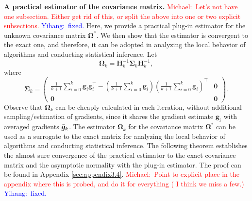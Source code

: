 \documentclass[aos]{imsart}
\numberwithin{equation}{section}
\theoremstyle{plain}
\newcommand{\michael}[1]{\textcolor{red}{Michael:\ #1}}
\newcommand{\yihang}[1]{\textcolor{blue}{Yihang:\ #1}}
\begin{document}
\textbf{A practical estimator of the covariance matrix.}
\michael{Let's not have one subsection.  Either get rid of this, or split the above into one or two explicit subsections.}
\yihang{fixed.}
Here, we provide a practical plug-in estimator for the unknown covariance matrix $\bm{\Omega}^{*}$. 
We then show that the estimator is convergent to the exact one, and therefore, it can be adopted in analyzing the local behavior of algorithms and conducting statistical inference.
Let 
\begin{equation}
    \bm{\Omega}_{k} = \bm{H}_{k}^{-1} \bm{\Sigma}_{k} \bm{H}_{k}^{-1},
\end{equation}
where 
\begin{equation*}
    \bm{\Sigma}_{k} = \left( \begin{array}{cc}
        \frac{1}{k+1}\sum_{i=0}^{k} \bm{g}_i \bm{g}_i^{\top} - \left( \frac{1}{k+1}\sum_{i=0}^{k} \bm{g}_i\right)\left( \frac{1}{k+1}\sum_{i=0}^{k} \bm{g}_i\right)^{\top} &  \bm{0}\\
         \bm{0} & \bm{0}
    \end{array}\right).
\end{equation*}
Observe that $\bm{\Omega}_k$ can be cheaply calculated in each iteration, without additional sampling/estimation of gradients, since it shares the gradient estimate $\bm{g}_i$ with averaged gradients $\Bar{\bm{g}}_k$.
The estimator $\bm{\Omega}_k$ for the covariance matrix $\bm{\Omega}^{*}$ can be used as a surrogate to the exact matrix for analyzing the local behavior of algorithms and conducting statistical inference.
The following theorem establishes the almost sure convergence of the practical estimator to the exact covariance matrix and the asymptotic normality with the plug-in estimator. The proof can be found in Appendix \ref{sec:appendix3.4}.
\michael{Point to explicit place in the appendix where this is probed, and do it for everything ( I think we miss a few.)}
\yihang{fixed.}
\end{document}
